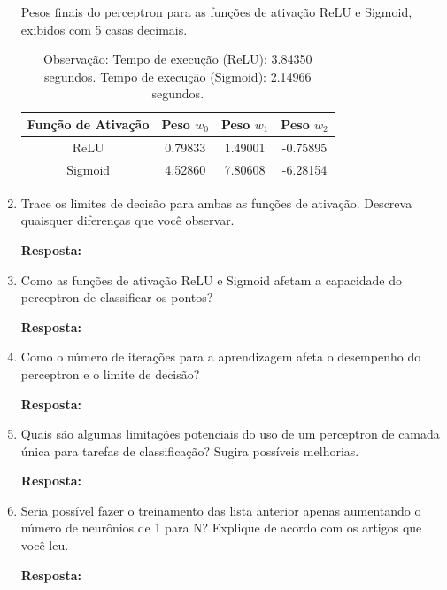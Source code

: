 \documentclass[12 pt]{article}
\begin{document}
\begin{enumerate}
    \begin{table}[h!]
        \centering
        \caption{Pesos finais do perceptron para as funções de ativação ReLU e Sigmoid, exibidos com 5 casas decimais.}
        \begin{tabular}{|c|c|c|c|}
            \hline
            \textbf{Função de Ativação} & \textbf{Peso} $w_0$ & \textbf{Peso} $w_1$ & \textbf{Peso} $w_2$ \\ \hline
            ReLU                        & 0.79833             & 1.49001             & -0.75895            \\ \hline
            Sigmoid                     & 4.52860             & 7.80608             & -6.28154            \\ \hline
        \end{tabular}
        \vspace{0.3cm}
        \caption*{Observação: Tempo de execução (ReLU): 3.84350 segundos. Tempo de execução (Sigmoid): 2.14966 segundos.}
        \label{tab:pesos_finais}
    \end{table}
    
    \item Trace os limites de decisão para ambas as funções de ativação. Descreva quaisquer diferenças que você observar.\par

    \textbf{Resposta:} \par
    \item Como as funções de ativação ReLU e Sigmoid afetam a capacidade do perceptron de classificar os pontos?\par

    \textbf{Resposta:} \par
    \item Como o número de iterações para a aprendizagem afeta o desempenho do perceptron e o limite de decisão?\par

    \textbf{Resposta:} \par
    \item Quais são algumas limitações potenciais do uso de um perceptron de camada única para tarefas de classificação? Sugira possíveis melhorias.\par

    \textbf{Resposta:} \par
    \item Seria possível fazer o treinamento das lista anterior apenas aumentando o número de neurônios de 1 para N? Explique de acordo com os artigos que você leu.\par

    \textbf{Resposta:} \par
\end{enumerate}
\end{document}
